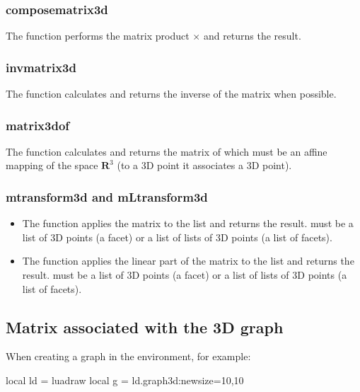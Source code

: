 \subsubsection{composematrix3d}
The function  performs the matrix product $\times$ and returns the result.

\subsubsection{invmatrix3d}
The function  calculates and returns the inverse of the matrix  when possible.

\subsubsection{matrix3dof}

The function  calculates and returns the matrix of  which must be an affine mapping of the space $\mathbf R^3$ (to a 3D point it associates a 3D point).

\subsubsection{mtransform3d and mLtransform3d}

\begin{itemize}
\item The function  applies the matrix  to the list  and returns the result.  must be a list of 3D points (a facet) or a list of lists of 3D points (a list of facets).
\item The function  applies the linear part of the matrix  to the list  and returns the result.  must be a list of 3D points (a facet) or a list of lists of 3D points (a list of facets).
\end{itemize}

\subsection{Matrix associated with the 3D graph}

When creating a graph in the \luadrawenv environment, for example:
\begin{Luacode}
local ld = luadraw
local g = ld.graph3d:new{size={10,10}}
\end{Luacode}

